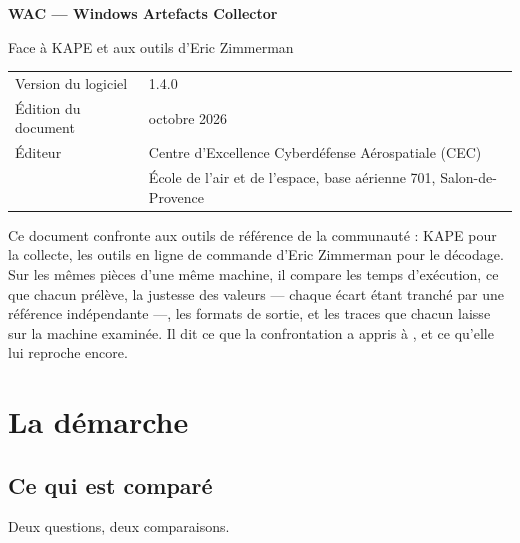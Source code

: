 \documentclass[11pt,a4paper,oneside]{report}
\begin{document}

\thispagestyle{empty}
\vspace*{\fill}
{\color{marine}\Large\bfseries WAC — Windows Artefacts Collector}\par
{\color{bleu}Face à KAPE et aux outils d'Eric Zimmerman}\par
\medskip
\begin{tabular}{@{}ll@{}}
Version du logiciel & 1.4.0 \\
Édition du document & octobre 2026 \\
Éditeur & Centre d'Excellence Cyberdéfense Aérospatiale (CEC) \\
        & École de l'air et de l'espace, base aérienne 701, Salon-de-Provence \\
\end{tabular}

\bigskip
{\small\color{gris}Ce document confronte \wac{} aux outils de référence de la
communauté : KAPE pour la collecte, les outils en ligne de commande d'Eric
Zimmerman pour le décodage. Sur les mêmes pièces d'une même machine, il compare
les temps d'exécution, ce que chacun prélève, la justesse des valeurs --- chaque
écart étant tranché par une référence indépendante ---, les formats de sortie, et
les traces que chacun laisse sur la machine examinée. Il dit ce que la
confrontation a appris à \wac{}, et ce qu'elle lui reproche encore.}
\vspace*{2cm}
\clearpage

\tableofcontents

\chapter{La démarche}

\section{Ce qui est comparé}

Deux questions, deux comparaisons.
\end{document}
